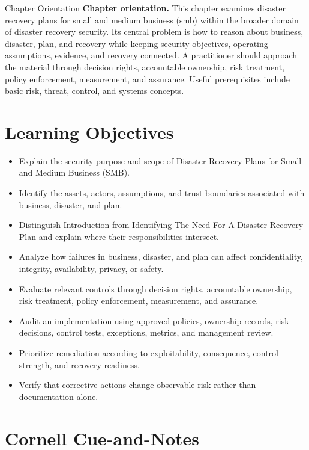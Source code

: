 \documentclass[11pt,letterpaper]{article}
\title{\CornellDocumentTitle}
\author{}
\date{}
\begin{document}
\maketitle
\begin{CornellOverviewBox}{Chapter Orientation}
\textbf{Chapter orientation.} This chapter examines disaster recovery plans for small and medium business (smb) within the broader domain of disaster recovery security. Its central problem is how to reason about business, disaster, plan, and recovery while keeping security objectives, operating assumptions, evidence, and recovery connected. A practitioner should approach the material through decision rights, accountable ownership, risk treatment, policy enforcement, measurement, and assurance. Useful prerequisites include basic risk, threat, control, and systems concepts.
\end{CornellOverviewBox}
\section*{Learning Objectives}
\begin{itemize}
\item Explain the security purpose and scope of Disaster Recovery Plans for Small and Medium Business (SMB).
\item Identify the assets, actors, assumptions, and trust boundaries associated with business, disaster, and plan.
\item Distinguish Introduction from Identifying The Need For A Disaster Recovery Plan and explain where their responsibilities intersect.
\item Analyze how failures in business, disaster, and plan can affect confidentiality, integrity, availability, privacy, or safety.
\item Evaluate relevant controls through decision rights, accountable ownership, risk treatment, policy enforcement, measurement, and assurance.
\item Audit an implementation using approved policies, ownership records, risk decisions, control tests, exceptions, metrics, and management review.
\item Prioritize remediation according to exploitability, consequence, control strength, and recovery readiness.
\item Verify that corrective actions change observable risk rather than documentation alone.
\end{itemize}
\section*{Cornell Cue-and-Notes}
\end{document}
